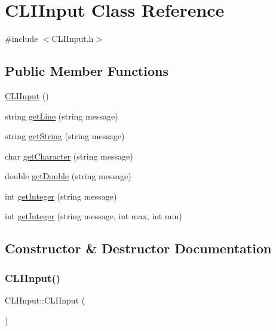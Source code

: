 \hypertarget{class_c_l_i_input}{}\section{C\+L\+I\+Input Class Reference}
\label{class_c_l_i_input}


{\ttfamily \#include $<$C\+L\+I\+Input.\+h$>$}

\subsection*{Public Member Functions}
\begin{DoxyCompactItemize}
\item 
\mbox{\hyperlink{class_c_l_i_input_a1c034047988b07e0dc3c91509c9582bc}{C\+L\+I\+Input}} ()
\item 
string \mbox{\hyperlink{class_c_l_i_input_ac3e4a25ba4abaca1a0394e1ad5e2018c}{get\+Line}} (string message)
\item 
string \mbox{\hyperlink{class_c_l_i_input_ab5d95ef35791eb9bf19ecbe53756cf75}{get\+String}} (string message)
\item 
char \mbox{\hyperlink{class_c_l_i_input_af1fe274ad0d0cda3037506c65d9ba877}{get\+Character}} (string message)
\item 
double \mbox{\hyperlink{class_c_l_i_input_a7c80b9716d784128c5b39212337302a9}{get\+Double}} (string message)
\item 
int \mbox{\hyperlink{class_c_l_i_input_a68cd02be014eb4b3b127766ecdd0ac99}{get\+Integer}} (string message)
\item 
int \mbox{\hyperlink{class_c_l_i_input_a078c66fb1836105f27382b4aaa58b5e4}{get\+Integer}} (string message, int max, int min)
\end{DoxyCompactItemize}


\subsection{Constructor \& Destructor Documentation}
\mbox{\label{class_c_l_i_input_a1c034047988b07e0dc3c91509c9582bc}} 
\subsubsection{\texorpdfstring{C\+L\+I\+Input()}{CLIInput()}}
{\footnotesize\ttfamily C\+L\+I\+Input\+::\+C\+L\+I\+Input (\begin{DoxyParamCaption}{ }\end{DoxyParamCaption})}

